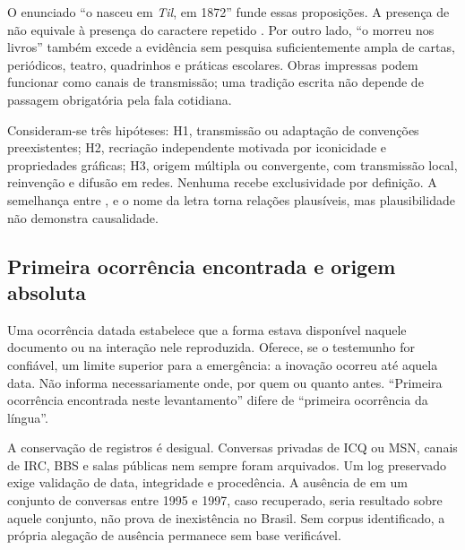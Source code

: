 O enunciado ``o  nasceu em \textit{Til}, em 1872'' funde essas proposições. A presença de  não equivale à presença do caractere repetido . Por outro lado, ``o  morreu nos livros'' também excede a evidência sem pesquisa suficientemente ampla de cartas, periódicos, teatro, quadrinhos e práticas escolares. Obras impressas podem funcionar como canais de transmissão; uma tradição escrita não depende de passagem obrigatória pela fala cotidiana.

Consideram-se três hipóteses: H1, transmissão ou adaptação de convenções preexistentes; H2, recriação independente motivada por iconicidade e propriedades gráficas; H3, origem múltipla ou convergente, com transmissão local, reinvenção e difusão em redes. Nenhuma recebe exclusividade por definição. A semelhança entre ,  e o nome da letra  torna relações plausíveis, mas plausibilidade não demonstra causalidade.

\subsection{Primeira ocorrência encontrada e origem absoluta}
Uma ocorrência datada estabelece que a forma estava disponível naquele documento ou na interação nele reproduzida. Oferece, se o testemunho for confiável, um limite superior para a emergência: a inovação ocorreu até aquela data. Não informa necessariamente onde, por quem ou quanto antes. ``Primeira ocorrência encontrada neste levantamento'' difere de ``primeira ocorrência da língua''.

A conservação de registros é desigual. Conversas privadas de ICQ ou MSN, canais de IRC, BBS e salas públicas nem sempre foram arquivados. Um log preservado exige validação de data, integridade e procedência. A ausência de  em um conjunto de conversas entre 1995 e 1997, caso recuperado, seria resultado sobre aquele conjunto, não prova de inexistência no Brasil. Sem corpus identificado, a própria alegação de ausência permanece sem base verificável.
